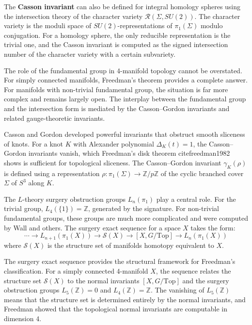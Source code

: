 The \textbf{Casson invariant} can also be defined for integral homology spheres using the intersection theory of the character variety $\mathcal{R}(\Sigma, SU(2))$. The character variety is the moduli space of $SU(2)$-representations of $\pi_1(\Sigma)$ modulo conjugation. For a homology sphere, the only reducible representation is the trivial one, and the Casson invariant is computed as the signed intersection number of the character variety with a certain subvariety.

The role of the fundamental group in 4-manifold topology cannot be overstated. For simply connected manifolds, Freedman's theorem provides a complete answer. For manifolds with non-trivial fundamental group, the situation is far more complex and remains largely open. The interplay between the fundamental group and the intersection form is mediated by the Casson--Gordon invariants and related gauge-theoretic invariants.

Casson and Gordon developed powerful invariants that obstruct smooth sliceness of knots. For a knot $K$ with Alexander polynomial $\Delta_K(t) = 1$, the Casson--Gordon invariants vanish, which Freedman's disk theorem cite{freedman1982} shows is sufficient for topological sliceness. The Casson--Gordon invariant $\gamma_K(\rho)$ is defined using a representation $\rho: \pi_1(\Sigma) \to \mathbb{Z}/p\mathbb{Z}$ of the cyclic branched cover $\Sigma$ of $S^3$ along $K$.

The $L$-theory surgery obstruction groups $L_n(\pi_1)$ play a central role. For the trivial group, $L_4(\{1\}) = \mathbb{Z}$, generated by the signature. For non-trivial fundamental groups, these groups are much more complicated and were computed by Wall and others. The surgery exact sequence for a space $X$ takes the form:
\[
\cdots \to L_{n+1}(\pi_1(X)) \to \mathcal{S}(X) \to [X, G/\text{Top}] \to L_n(\pi_1(X))
\]
where $\mathcal{S}(X)$ is the structure set of manifolds homotopy equivalent to $X$.

The surgery exact sequence provides the structural framework for Freedman's classification. For a simply connected 4-manifold $X$, the sequence relates the structure set $\mathcal{S}(X)$ to the normal invariants $[X, G/\text{Top}]$ and the surgery obstruction groups $L_5(\mathbb{Z}) = 0$ and $L_4(\mathbb{Z}) = \mathbb{Z}$. The vanishing of $L_5(\mathbb{Z})$ means that the structure set is determined entirely by the normal invariants, and Freedman showed that the topological normal invariants are computable in dimension 4.

